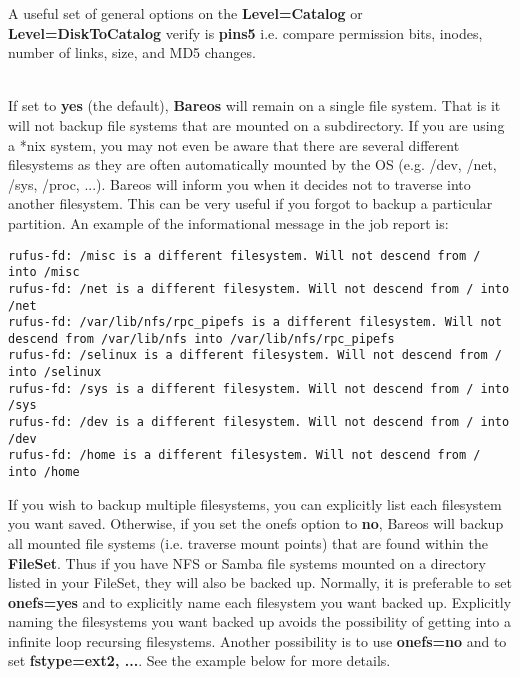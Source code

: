 \begin{description}
\begin{description}
      \end{description}

   A useful set of general options on the {\bf Level=Catalog}  or {\bf
   Level=DiskToCatalog}  verify is {\bf pins5} i.e. compare permission bits,
   inodes, number  of links, size, and MD5 changes.

\item [onefs=yes{\textbar}no] \hfill \\
   If set to {\bf yes} (the default), {\bf Bareos} will remain on a single
   file system.  That is it will not backup file systems that are mounted
   on a subdirectory.  If you are using a *nix system, you may not even be
   aware that there are several different filesystems as they are often
   automatically mounted by the OS (e.g.  /dev, /net, /sys, /proc, ...).
   Bareos will inform you when it decides not to
   traverse into another filesystem.  This can be very useful if you forgot
   to backup a particular partition.  An example of the informational
   message in the job report is:

\footnotesize
\begin{verbatim}
rufus-fd: /misc is a different filesystem. Will not descend from / into /misc
rufus-fd: /net is a different filesystem. Will not descend from / into /net
rufus-fd: /var/lib/nfs/rpc_pipefs is a different filesystem. Will not descend from /var/lib/nfs into /var/lib/nfs/rpc_pipefs
rufus-fd: /selinux is a different filesystem. Will not descend from / into /selinux
rufus-fd: /sys is a different filesystem. Will not descend from / into /sys
rufus-fd: /dev is a different filesystem. Will not descend from / into /dev
rufus-fd: /home is a different filesystem. Will not descend from / into /home
\end{verbatim}
\normalsize

   If you wish to backup multiple filesystems, you can  explicitly
   list each filesystem you want saved.  Otherwise, if you set the onefs option
   to {\bf no}, Bareos will backup  all mounted file systems (i.e. traverse mount
   points) that  are found within the {\bf FileSet}. Thus if  you have NFS or
   Samba file systems mounted on a directory listed  in your FileSet, they will
   also be backed up. Normally, it is  preferable to set {\bf onefs=yes} and to
   explicitly name  each filesystem you want backed up. Explicitly naming  the
   filesystems you want backed up avoids the possibility  of getting into a
   infinite loop recursing filesystems.  Another possibility is to
   use {\bf onefs=no} and to set {\bf fstype=ext2, ...}.
   See the example below for more details.


\end{description}
